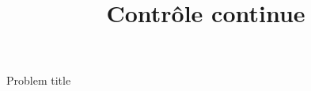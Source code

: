 \documentclass[exam]{cs188}
\title{Contrôle continue}
\begin{document}
\newpage

\begin{problem}[]{Problem title}
  
\end{problem}
\end{document}
